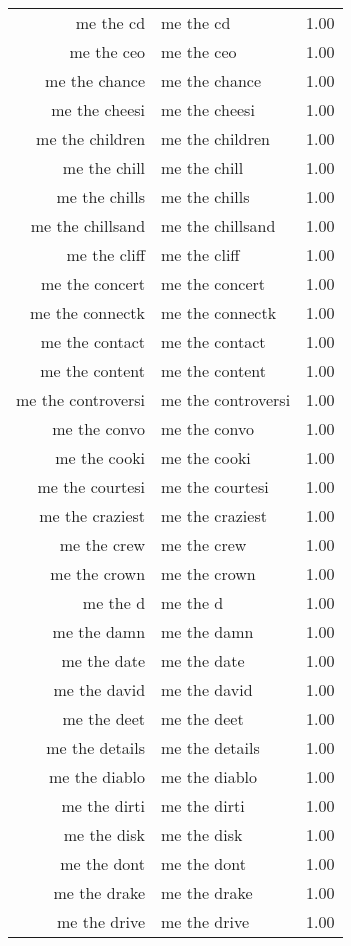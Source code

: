 \begin{table}[ht]
\begin{tabular}{rlr}
  me the cd & me the cd & 1.00 \\ 
  me the ceo & me the ceo & 1.00 \\ 
  me the chance & me the chance & 1.00 \\ 
  me the cheesi & me the cheesi & 1.00 \\ 
  me the children & me the children & 1.00 \\ 
  me the chill & me the chill & 1.00 \\ 
  me the chills & me the chills & 1.00 \\ 
  me the chillsand & me the chillsand & 1.00 \\ 
  me the cliff & me the cliff & 1.00 \\ 
  me the concert & me the concert & 1.00 \\ 
  me the connectk & me the connectk & 1.00 \\ 
  me the contact & me the contact & 1.00 \\ 
  me the content & me the content & 1.00 \\ 
  me the controversi & me the controversi & 1.00 \\ 
  me the convo & me the convo & 1.00 \\ 
  me the cooki & me the cooki & 1.00 \\ 
  me the courtesi & me the courtesi & 1.00 \\ 
  me the craziest & me the craziest & 1.00 \\ 
  me the crew & me the crew & 1.00 \\ 
  me the crown & me the crown & 1.00 \\ 
  me the d & me the d & 1.00 \\ 
  me the damn & me the damn & 1.00 \\ 
  me the date & me the date & 1.00 \\ 
  me the david & me the david & 1.00 \\ 
  me the deet & me the deet & 1.00 \\ 
  me the details & me the details & 1.00 \\ 
  me the diablo & me the diablo & 1.00 \\ 
  me the dirti & me the dirti & 1.00 \\ 
  me the disk & me the disk & 1.00 \\ 
  me the dont & me the dont & 1.00 \\ 
  me the drake & me the drake & 1.00 \\ 
  me the drive & me the drive & 1.00 \\ 

\end{tabular}
\end{table}
